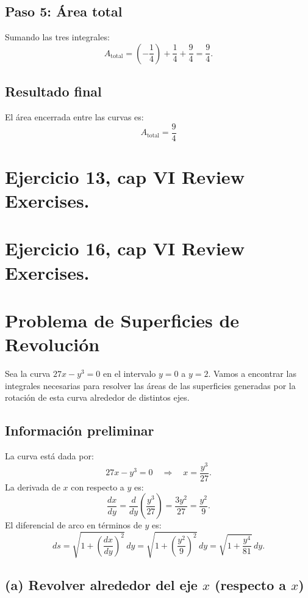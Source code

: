 \documentclass[11pt,letterpaper]{article}
\begin{document}
\subsection*{Paso 5: Área total}
Sumando las tres integrales:
\[
A_{\text{total}} = \left(-\frac{1}{4}\right) + \frac{1}{4} + \frac{9}{4} = \frac{9}{4}.
\]

\subsection*{Resultado final}
El área encerrada entre las curvas es:
\[
\boxed{A_{\text{total}} = \frac{9}{4}}
\]

\section{Ejercicio 13, cap VI Review Exercises.}

\section{Ejercicio 16, cap VI Review Exercises.}
\section*{Problema de Superficies de Revolución}

Sea la curva \( 27x - y^3 = 0 \) en el intervalo \( y = 0 \) a \( y = 2 \). Vamos a encontrar las integrales necesarias para resolver las áreas de las superficies generadas por la rotación de esta curva alrededor de distintos ejes.

\subsection*{Información preliminar}

La curva está dada por:
\[
27x - y^3 = 0 \quad \Rightarrow \quad x = \frac{y^3}{27}.
\]
La derivada de \(x\) con respecto a \(y\) es:
\[
\frac{dx}{dy} = \frac{d}{dy}\left(\frac{y^3}{27}\right) = \frac{3y^2}{27} = \frac{y^2}{9}.
\]
El diferencial de arco en términos de \(y\) es:
\[
ds = \sqrt{1 + \left(\frac{dx}{dy}\right)^2} \, dy = \sqrt{1 + \left(\frac{y^2}{9}\right)^2} \, dy = \sqrt{1 + \frac{y^4}{81}} \, dy.
\]

\subsection*{(a) Revolver alrededor del eje \(x\) (respecto a \(x\))}
\end{document}

